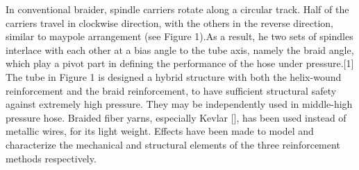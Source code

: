 In conventional braider, spindle carriers rotate along a circular track. Half of the carriers travel in clockwise direction, with the others in the reverse direction, similar to maypole arrangement (see Figure 1).As a result, he two sets of spindles interlace with each other at a bias angle to the tube axis, namely the braid angle, which play a pivot part in defining the performance of the hose under pressure.[1]
The tube in Figure 1 is designed a hybrid structure with both the helix-wound reinforcement and the braid reinforcement, to have sufficient structural safety against extremely high pressure. They may be independently used in middle-high pressure hose. Braided fiber yarns, especially Kevlar [], has been used instead of metallic wires, for its light weight. Effects have been made to model and characterize the mechanical and structural elements of the three reinforcement methods respectively.



